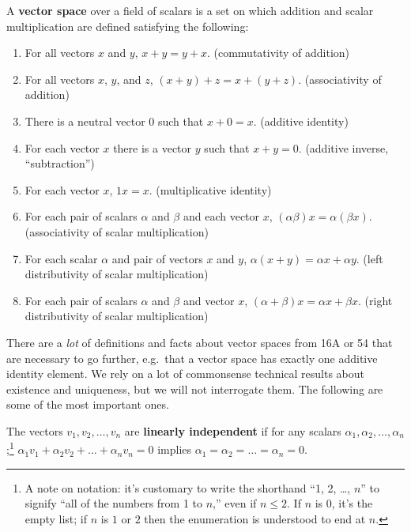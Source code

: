 \begin{definition}
A \textbf{vector space} over a field of scalars is a set on which addition and scalar multiplication are defined satisfying the following:
\begin{enumerate}
  \item
  For all vectors \(x\) and \(y\), \(x + y=y + x\).
  (commutativity of addition)
  \item
   For all vectors \(x\), \(y\), and \(z\), \((x + y) + z = x + (y + z)\).
  (associativity of addition)
  \item
  There is a neutral vector 0 such that \(x + 0 = x\).
  (additive identity)
  \item
  For each vector \(x\) there is a vector \(y\) such that \(x + y = 0\).
  (additive inverse, ``subtraction'')
  \item
  For each vector \(x\), \(1x = x\).
  (multiplicative identity)
  \item
  For each pair of scalars \(\alpha\) and \(\beta\) and each vector \(x\),
  \((\alpha\beta)x = \alpha(\beta x)\).
  (associativity of scalar multiplication)
  \item
  For each scalar \(\alpha\) and pair of vectors \(x\) and \(y\),
  \(\alpha(x + y) = \alpha x + \alpha y\).
  (left distributivity of scalar multiplication)
  \item
  For each pair of scalars \(\alpha\) and \(\beta\) and vector \(x\),
  \((\alpha + \beta) x = \alpha x + \beta x\).
  (right distributivity of scalar multiplication)
\end{enumerate}
\end{definition}
There are a \emph{lot} of definitions and facts about vector spaces from 16A or 54 that are necessary to go further, e.g.~that a vector space has exactly one additive identity element.
We rely on a lot of commonsense technical results about existence and uniqueness, but we will not interrogate them.
The following are some of the most important ones.

\begin{definition}
  The vectors \(v_1, v_2, \ldots, v_n\) are \textbf{linearly independent} if
  for any scalars \(\alpha_1, \alpha_2, \ldots, \alpha_n\);\footnote{A note on notation: it's customary to write the shorthand ``1, 2, \ldots, \(n\)''  to signify ``all of the numbers from 1 to \(n\),'' even if \(n \leq 2\). If \(n\) is 0, it's the empty list; if \(n\) is \(1\) or \(2\) then the enumeration is understood to end at \(n\).}
  \(\alpha_1 v_1 + \alpha_2 v_2 + \ldots + \alpha_n v_n = 0\)
  implies
  \(\alpha_1 = \alpha_2 = \ldots = \alpha_n = 0\).
\end{definition}

